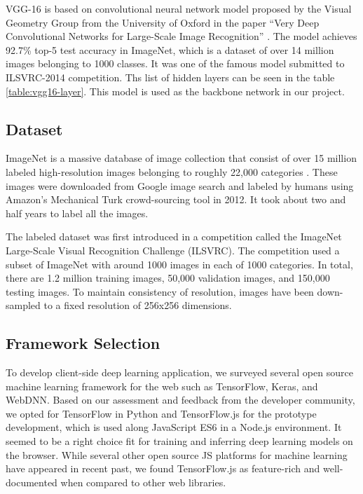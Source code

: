 VGG-16 is based on convolutional neural network model proposed by the Visual Geometry Group from the University of Oxford in the paper “Very Deep Convolutional Networks for Large-Scale Image Recognition” \cite{2014arXiv1409.1556S}. The model achieves 92.7\% top-5 test accuracy in ImageNet, which is a dataset of over 14 million images belonging to 1000 classes. It was one of the famous model submitted to ILSVRC-2014 competition. Ths list of hidden layers can be seen in the table \ref{table:vgg16-layer}. This model is used as the backbone network in our project.

\subsection{Dataset}

ImageNet is a massive database of image collection that consist of over 15 million labeled high-resolution images belonging to roughly 22,000 categories \cite{edsarx.1409.057520140101}. These images were downloaded from Google image search and labeled by humans using Amazon's Mechanical Turk crowd-sourcing tool in 2012. It took about two and half years to label all the images. 

The labeled dataset was first introduced in a competition called the ImageNet Large-Scale Visual Recognition Challenge (ILSVRC). The competition used a subset of ImageNet with around 1000 images in each of 1000 categories. In total, there are 1.2 million training images, 50,000 validation images, and 150,000 testing images. To maintain consistency of resolution, images have been down-sampled to a fixed resolution of 256x256 dimensions.
    
\subsection{Framework Selection}

To develop client-side deep learning application, we surveyed several open source machine learning framework for the web such as TensorFlow, Keras, and WebDNN. Based on our assessment and feedback from the developer community, we opted for TensorFlow in Python and TensorFlow.js for the prototype development, which is used along JavaScript ES6 in a Node.js environment. It seemed to be a right choice fit for training and inferring deep learning models on the browser. While several other open source JS platforms for machine learning have appeared in recent past, we found TensorFlow.js as feature-rich and well-documented when compared to other web libraries.

